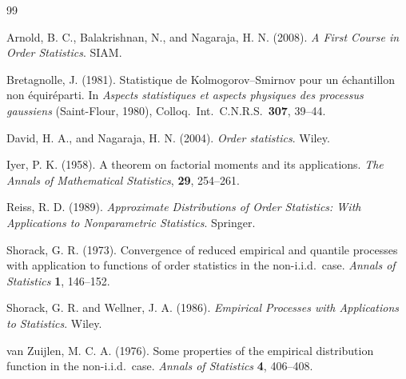 \documentclass[12pt]{article}
\theoremstyle{remark}
\begin{document}
\begin{thebibliography}{99}
	
	Arnold, B. C., Balakrishnan, N., and Nagaraja, H. N. (2008). \textit{A First Course in Order Statistics}. SIAM.
	
	Bretagnolle, J. (1981).	Statistique de Kolmogorov--Smirnov pour un échantillon non équiréparti.	In \textit{Aspects statistiques et aspects physiques des processus gaussiens} (Saint-Flour, 1980),	Colloq.\ Int.\ C.N.R.S.\ \textbf{307}, 39--44.
	
	David, H. A., and Nagaraja, H. N. (2004). \textit{Order statistics}. Wiley.
	

    Iyer, P. K. (1958). A theorem on factorial moments and its applications. \textit{The Annals of Mathematical Statistics}, \textbf{29}, 254--261.
	
	
	
	Reiss, R. D. (1989). \textit{Approximate Distributions of Order Statistics: With Applications to Nonparametric Statistics}. Springer.
	
	Shorack, G. R. (1973). Convergence of reduced empirical and quantile processes with application to functions of order statistics in the non-i.i.d.\ case. \textit{Annals of Statistics} \textbf{1}, 146--152. 
	
	Shorack, G. R. and Wellner, J. A. (1986). \textit{Empirical Processes with Applications to Statistics}. Wiley.
	
	van Zuijlen, M. C. A. (1976). Some properties of the empirical distribution function in the non-i.i.d.\ case.
	\textit{Annals of Statistics} \textbf{4}, 406--408.
\end{thebibliography}
\end{document}
